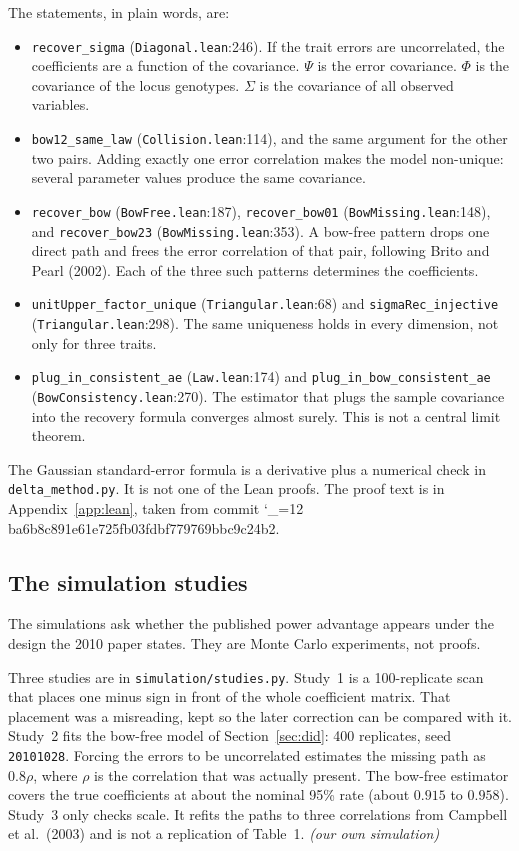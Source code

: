 \documentclass[11pt]{article}
\makeatletter
\newcommand{\sha}{\begingroup\catcode`\_=12 \sha@read}
\newcommand{\sha@read}[1]{\ttfamily\sha@loop#1\relax\endgroup}
\def\sha@loop#1{%
  \ifx\relax#1\else
    #1\allowbreak
    \expandafter\sha@loop
  \fi}
\newcommand{\ev}[1]{\textup{\emph{(#1)}}}
\makeatother
\begin{document}
The statements, in plain words, are:
\begin{itemize}
\item \texttt{recover\_sigma} (\texttt{Diagonal.lean}:246). If the trait
errors are uncorrelated, the coefficients are a function of the covariance.
$\Psi$ is the error covariance. $\Phi$ is the covariance of the locus
genotypes. $\Sigma$ is the covariance of all observed variables.
\item \texttt{bow12\_same\_law} (\texttt{Collision.lean}:114), and the same
argument for the other two pairs. Adding exactly one error correlation makes
the model non-unique: several parameter values produce the same covariance.
\item \texttt{recover\_bow} (\texttt{BowFree.lean}:187),
\texttt{recover\_bow01} (\texttt{BowMissing.lean}:148), and
\texttt{recover\_bow23} (\texttt{BowMissing.lean}:353). A bow-free pattern
drops one direct path and frees the error correlation of that pair, following
Brito and Pearl (2002). Each of the three such patterns determines the
coefficients.
\item \texttt{unitUpper\_factor\_unique} (\texttt{Triangular.lean}:68) and
\texttt{sigmaRec\_injective} (\texttt{Triangular.lean}:298). The same
uniqueness holds in every dimension, not only for three traits.
\item \texttt{plug\_in\_consistent\_ae} (\texttt{Law.lean}:174) and
\texttt{plug\_in\_bow\_consistent\_ae}
(\texttt{BowConsistency.lean}:270). The estimator that plugs the sample
covariance into the recovery formula converges almost surely. This is not a
central limit theorem.
\end{itemize}
The Gaussian standard-error formula is a derivative plus a numerical check
in \texttt{delta\_method.py}. It is not one of the Lean proofs. The proof
text is in Appendix~\ref{app:lean}, taken from commit
\sha{1ba6b8c891e61e725fb03fdbf779769bbc9c24b2}.

\subsection{The simulation studies}

The simulations ask whether the published power advantage appears under the
design the 2010 paper states. They are Monte Carlo experiments, not proofs.

Three studies are in \texttt{simulation/studies.py}. Study~1 is a
100-replicate scan that places one minus sign in front of the whole
coefficient matrix. That placement was a misreading, kept so the later
correction can be compared with it. Study~2 fits the bow-free model of
Section~\ref{sec:did}: 400 replicates, seed \texttt{20101028}. Forcing the
errors to be uncorrelated estimates the missing path as $0.8\rho$, where
$\rho$ is the correlation that was actually present. The bow-free estimator
covers the true coefficients at about the nominal 95\% rate (about $0.915$
to $0.958$). Study~3 only checks scale. It refits the paths to three
correlations from Campbell et al.\ (2003) and is not a replication of
Table~1. \ev{our own simulation}
\end{document}

